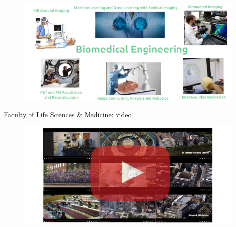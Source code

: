 
{
\begin{frame}{}

  \begin{figure}
  \centering
  \includegraphics[width=1.0\textwidth]{./../figures/biomedical-engineer/versions/drawing-v04}
  \end{figure}

\end{frame}
}



{
\begin{frame}{Faculty of Life Sciences \& Medicine: video}

  \begin{figure}
  \centering
  \includegraphics[width=1.0\textwidth]{./../figures/videos-life-science-and-medicine/versions/drawing-v00}
  \end{figure}

\end{frame}
}





